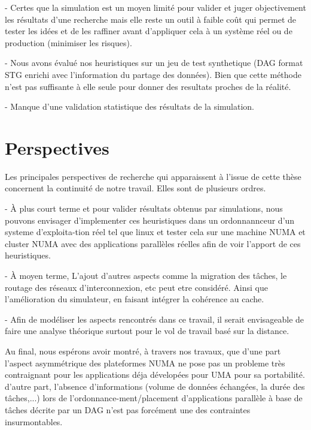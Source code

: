 - Certes que la simulation est un moyen limité pour valider et juger objectivement les résultats d'une recherche 
mais elle reste un outil à faible coût qui permet de tester les idées et de les raffiner avant d'appliquer cela à un système réel ou de production (minimiser les risques).    

- Nous avons évalué nos heuristiques sur un jeu de test synthetique (DAG format STG enrichi avec l'information du partage des données). 
Bien que cette méthode n'est pas suffisante à elle seule pour donner des resultats proches de la réalité.

- Manque d'une validation statistique des résultats de la simulation.
%
\section{Perspectives}
%
Les principales perspectives de recherche qui apparaissent à l'issue de cette thèse concernent la continuité de notre travail. Elles sont de plusieurs ordres.

- À plus court terme et pour valider résultats obtenus par simulations, nous pouvons envisager d'implementer ces heuristiques dans un ordonnannceur d'un systeme d'exploita-tion réel tel que linux et tester cela sur une machine NUMA et cluster NUMA avec des applications parallèles réelles afin de voir l'apport de ces heuristiques. 

- À moyen terme, L'ajout d'autres aspects comme la migration des tâches, le routage des réseaux d'interconnexion, etc peut etre considéré.
Ainsi que l'amélioration du simulateur, en faisant intégrer la cohérence au cache. 

- Afin de modéliser les aspects rencontrés dans ce travail, il serait envisageable de faire une analyse théorique surtout pour le vol de travail basé sur la distance. 

Au final, nous espérons avoir montré, à travers nos travaux, que d'une part l'aspect asymmétrique des plateformes NUMA ne pose pas un probleme très contraignant pour les applications déja dévelopées pour UMA pour sa portabilité. d'autre part, l’absence d’informations (volume de données échangées, la durée des tâches,...) lors de l’ordonnance-ment/placement d’applications parallèle à base de tâches décrite par un DAG n'est pas forcément une des contraintes insurmontables.
